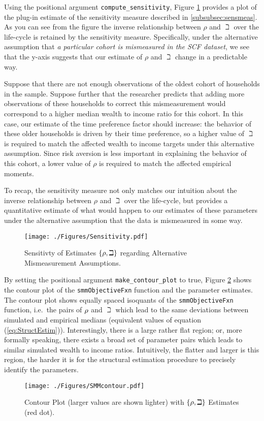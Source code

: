 Using the positional argument \texttt{compute\_sensitivity}, Figure \ref{fig:PlotSensitivityMeasure} provides a plot of the plug-in estimate of the sensitivity measure described in \ref{subsubsec:sensmeas}. As you can see from the figure the inverse relationship between $\rho$ and $\beth$ over the life-cycle is retained by the sensitivity measure. Specifically, under the alternative assumption that \textit{a particular cohort is mismeasured in the SCF dataset}, we see that the y-axis suggests that our estimate of $\rho$ and $\beth$ change in a predictable way.

Suppose that there are not enough observations of the oldest cohort of households in the sample. Suppose further that the researcher predicts that adding more observations of these households to correct this mismeasurement would correspond to a higher median wealth to income ratio for this cohort. In this case, our estimate of the time preference factor should increase: the behavior of these older households is driven by their time preference, so a higher value of $\beth$ is required to match the affected wealth to income targets under this alternative assumption. Since risk aversion is less important in explaining the behavior of this cohort, a lower value of $\rho$ is required to match the affected empirical moments.

To recap, the sensitivity measure not only matches our intuition about the inverse relationship between $\rho$ and $\beth$ over the life-cycle, but provides a quantitative estimate of what would happen to our estimates of these parameters under the alternative assumption that the data is mismeasured in some way.

\hypertarget{PlotSensitivityMeasure}{}
\begin{figure}
  \texttt{[image: ./Figures/Sensitivity.pdf]}
  \caption{Sensitivty of Estimates $\{\rho,\beth\}$ regarding Alternative Mismeasurement Assumptions.}
  \label{fig:PlotSensitivityMeasure}
\end{figure}

By setting the positional argument \texttt{make\_contour\_plot} to true, Figure \ref{fig:PlotContourMedianStrEst} shows the contour plot of the \texttt{smmObjectiveFxn} function and the parameter estimates. The contour plot shows equally spaced isoquants of the \texttt{smmObjectiveFxn} function, i.e.\ the pairs of $\rho$ and $\beth$ which lead to the same deviations between simulated and empirical medians (equivalent values of equation (\ref{eq:StructEstim})). Interestingly, there is a large rather flat region; or, more formally speaking, there exists a broad set of parameter pairs which leads to similar simulated wealth to income ratios. Intuitively, the flatter and larger is this region, the harder it is for the structural estimation procedure to precisely identify the parameters.


\hypertarget{PlotContourMedianStrEst}{}
\begin{figure}
  \texttt{[image: ./Figures/SMMcontour.pdf]}
  \caption{Contour Plot (larger values are shown lighter) with $\{\rho,\beth\}$ Estimates (red dot).}
  \label{fig:PlotContourMedianStrEst}
\end{figure}

